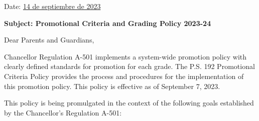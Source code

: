 \documentclass[12pt,letterpaper]{article}
\begin{document}
\vspace*{0.5in}
Date: \href{https://www.ps192.org/apps/bbmessages/show_bbm.jsp?REC_ID=139439}{14 de septiembre de 2023} 

\textbf{Subject: Promotional Criteria and Grading Policy 2023-24}

Dear Parents and Guardians,

Chancellor Regulation A-501 implements a system-wide promotion policy with clearly defined standards for
promotion for each grade. The P.S. 192 Promotional Criteria Policy provides the process and procedures
for the implementation of this promotion policy. This policy is effective as of September 7, 2023.

This policy is being promulgated in the context of the following goals established by the Chancellor’s
Regulation A-501:
\end{document}
